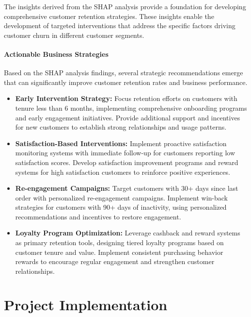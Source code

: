 \documentclass{article}
\begin{document}
The insights derived from the SHAP analysis provide a foundation for developing comprehensive customer retention strategies. These insights enable the development of targeted interventions that address the specific factors driving customer churn in different customer segments.

\paragraph{Actionable Business Strategies}

Based on the SHAP analysis findings, several strategic recommendations emerge that can significantly improve customer retention rates and business performance.

\begin{itemize}
    \item \textbf{Early Intervention Strategy:} Focus retention efforts on customers with tenure less than 6 months, implementing comprehensive onboarding programs and early engagement initiatives. Provide additional support and incentives for new customers to establish strong relationships and usage patterns.
    
    \item \textbf{Satisfaction-Based Interventions:} Implement proactive satisfaction monitoring systems with immediate follow-up for customers reporting low satisfaction scores. Develop satisfaction improvement programs and reward systems for high satisfaction customers to reinforce positive experiences.
    
    \item \textbf{Re-engagement Campaigns:} Target customers with 30+ days since last order with personalized re-engagement campaigns. Implement win-back strategies for customers with 90+ days of inactivity, using personalized recommendations and incentives to restore engagement.
    
    \item \textbf{Loyalty Program Optimization:} Leverage cashback and reward systems as primary retention tools, designing tiered loyalty programs based on customer tenure and value. Implement consistent purchasing behavior rewards to encourage regular engagement and strengthen customer relationships.
\end{itemize}

\section{Project Implementation}
\end{document}
